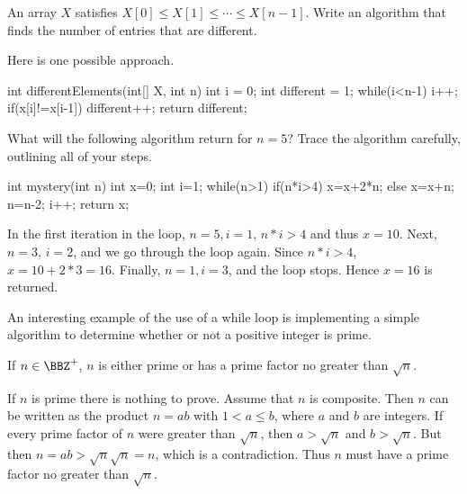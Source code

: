 \begin{exa}
An array $X$ satisfies $X[0] \leq X[1] \leq \cdots \leq X[n - 1]$. 
Write an algorithm that finds the number of entries that are different.
\begin{sol}
Here is one possible approach.
\begin{code}
int differentElements(int[] X, int n) {
    int i = 0;
    int different = 1;
    while(i<n-1) {
        i++;
        if(x[i]!=x[i-1]) {
            different++;
        }
    }
    return different;
}
\end{code}
\end{sol}
\end{exa}

\begin{exer}
What will the following
algorithm return for $n = 5$? 
Trace the algorithm carefully, outlining all of your steps. 
\begin{code}
    int mystery(int n) {
        int x=0;
        int i=1;
        while(n>1) {
            if(n*i>4) {
                x=x+2*n;
            } else {
                x=x+n;
            }
            n=n-2;
            i++;
        }
        return x;
    }
\end{code}
\begin{answer} In the first iteration in the loop, 
$n = 5, i = 1$, $n*i > 4$ and thus $x = 10.$ 
Next, $n = 3$, $i = 2$, and we go through the loop again. 
Since $n*i > 4$, $x = 10 + 2*3 = 16$.
Finally, $n = 1, i = 3$, and the loop stops. Hence $x = 16$ is
returned.
\end{answer}
\end{exer}

An interesting example of the use of a while loop is 
implementing a simple algorithm to determine whether or
not a positive integer is prime.

\begin{thm}\label{thm:erathostenes_primality}
If $n\in\BBZ^+$, $n$ is either prime or has a prime factor  no greater than
$\sqrt{n}$.
\begin{pf}
If $n$ is prime there is nothing to prove. Assume that $n$ is composite. 
Then  $n$ can be written as the product $n = ab$ with $1 <a\leq b$, where $a$ and $b$ are integers. 
If every prime factor
of $n$ were greater than $\sqrt{n}$, then $a>\sqrt{n}$ and $b>\sqrt{n}$.
But then $n = ab > \sqrt{n}\sqrt{n} = n$, which is a contradiction. Thus $n$ must have a prime factor
no greater than $\sqrt{n}$.
\end{pf}
\end{thm}



